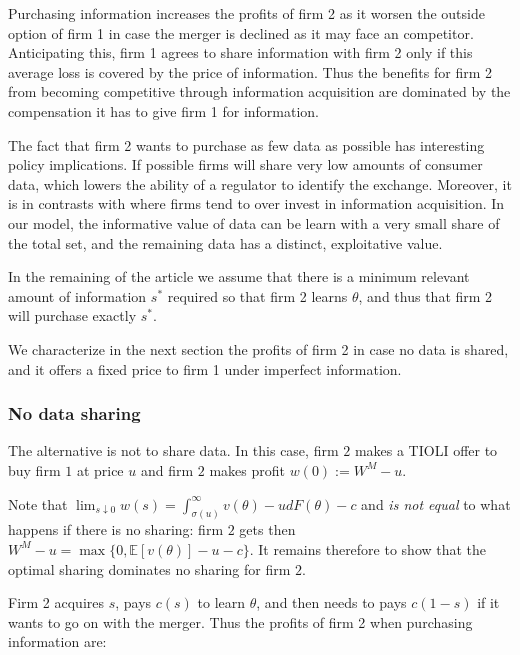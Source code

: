 \documentclass[a4paper,leqno]{article}%
\newcommand{\E}{\mathbb E}
\renewcommand{\t}{\theta}
\newcommand{\s}{\sigma}
\begin{document}
Purchasing information increases the profits of firm 2 as it worsen the outside option of firm 1 in case the merger is declined as it may face an competitor. Anticipating this, firm 1 agrees to share information with firm 2 only if this average loss is covered by the price of information. Thus the benefits for firm 2 from becoming competitive through information acquisition are dominated by the compensation it has to give firm 1 for information. 

\medskip

The fact that firm 2 wants to purchase as few data as possible has interesting policy implications. If possible firms will share very low amounts of consumer data, which lowers the ability of a regulator to identify the exchange. Moreover, it is in contrasts with \cite{hirshleifer1978private} where firms tend to over invest in information acquisition. In our model, the informative value of data can be learn with a very small share of the total set, and the remaining data has a distinct, exploitative value.

\medskip


In the remaining of the article we assume that there is a minimum relevant amount of information $s^*$ required so that firm 2 learns $\t$, and thus that firm 2 will purchase exactly $s^*$. 

\medskip

We characterize in the next section the profits of firm 2 in case no data is shared, and it offers a fixed price to firm 1 under imperfect information. 



\subsubsection{No data sharing}

The alternative is not to share data. In this case, firm $2$ makes a TIOLI offer to buy firm $1$ at price $u$ and firm $2$ makes profit $w(0):=W^M-u$.

\medskip

Note that $\lim_{s\downarrow 0}w(s)=\int_{\s(u)}^\infty v(\t)-u dF(\t)-c$ and \emph{is not equal } to what happens if there is no sharing: firm $2$ gets then $W^M-u=\max\{0, \E[v(\t)]-u-c\}$. It remains therefore to show that the optimal sharing dominates no sharing for firm $2$. 

\medskip

Firm 2 acquires $s$, pays $c(s)$ to learn $\t$, and then needs to pays $c(1-s)$ if it wants to go on with the merger. Thus the profits of firm 2 when purchasing information are:
\end{document}
